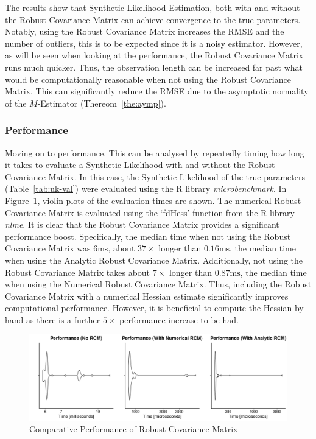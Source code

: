 The results show that Synthetic Likelihood Estimation, both with and without the Robust Covariance Matrix can achieve convergence to the true parameters. Notably, using the Robust Covariance Matrix increases the RMSE and the number of outliers, this is to be expected since it is a noisy estimator. However, as will be seen when looking at the performance, the Robust Covariance Matrix runs much quicker. Thus, the observation length can be increased far past what would be computationally reasonable when not using the Robust Covariance Matrix. This can significantly reduce the RMSE due to the asymptotic normality of the $M$-Estimator (Thereom~\ref{the:aymp}).

\subsubsection{Performance}
\label{subsec:perf}

Moving on to performance. This can be analysed by repeatedly timing how long it takes to evaluate a Synthetic Likelihood with and without the Robust Covariance Matrix. In this case, the Synthetic Likelihood of the true parameters (Table~\ref{tab:uk-val}) were evaluated using the R library \emph{microbenchmark}. In Figure~\ref{fig:ss-perf}, violin plots of the evaluation times are shown. The numerical Robust Covariance Matrix is evaluated using the `fdHess' function from the R library \emph{nlme}. It is clear that the Robust Covariance Matrix provides a significant performance boost. Specifically, the median time when not using the Robust Covariance Matrix was $6$ms, about $37\times$ longer than $0.16\text{ms}$, the median time when using the Analytic Robust Covariance Matrix. Additionally, not using the Robust Covariance Matrix takes about $7\times$ longer than $0.87\text{ms}$, the median time when using the Numerical Robust Covariance Matrix. Thus, including the Robust Covariance Matrix with a numerical Hessian estimate significantly improves computational performance. However, it is beneficial to compute the Hessian by hand as there is a further $5\times$ performance increase to be had.

\begin{figure}[H]
        \centering
        \includegraphics[width=12cm]{images/fitting/simple_model/perf.pdf}
        \caption{Comparative Performance of Robust Covariance Matrix}
        \label{fig:ss-perf}
\end{figure}

